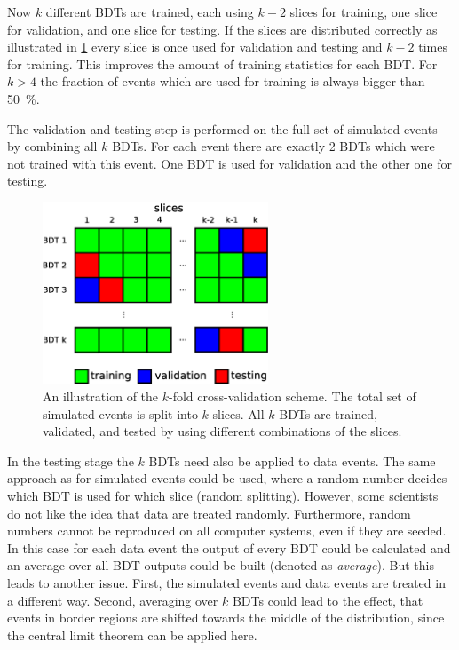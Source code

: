 Now $k$ different BDTs are trained, each using $k-2$ slices for training, one slice for validation, and one slice for testing.
If the slices are distributed correctly as illustrated in \cref{fig:mva:kfold-xval} every slice is once used for validation
and testing and $k - 2$ times for training.
This improves the amount of training statistics for each BDT\@.
For $k > 4$ the fraction of events which are used for training is always bigger than \SI{50}{\percent}.

The validation and testing step is performed on the full set of simulated events by combining all $k$ BDTs.
For each event there are exactly 2 BDTs which were not trained with this event.
One BDT is used for validation and the other one for testing.

\begin{figure}[htb]
    \centering
    \includegraphics[width=0.6\textwidth]{./figures/mva/kfold-xval.eps}
    \caption{An illustration of the $k$-fold cross-validation scheme. The total set of simulated events is split into $k$ slices.
             All $k$ BDTs are trained, validated, and tested by using different combinations of the slices.}\label{fig:mva:kfold-xval}
\end{figure}

In the testing stage the $k$ BDTs need also be applied to data events.
The same approach as for simulated events could be used, where
a random number decides which BDT is used for which slice (random splitting).
However, some scientists do not like the idea that data are treated randomly.
Furthermore, random numbers cannot be reproduced on all computer systems, even if they are seeded.
In this case for each data event the output of every BDT could be calculated
and an average over all BDT outputs could be built (denoted as \emph{average}).
But this leads to another issue.
First, the simulated events and data events are treated in a different way.
Second, averaging over $k$ BDTs could lead to the effect, that events in border regions
are shifted towards the middle of the distribution, since the central limit theorem can be applied here.

